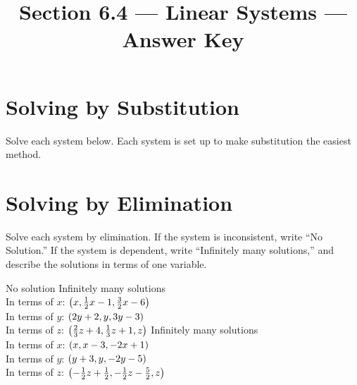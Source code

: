

\title{Section 6.4 --- Linear Systems --- Answer Key}


\maketitle

\section*{Solving by Substitution}
Solve each system below. Each system is set up to make substitution the easiest method.
\begin{smenum}
\maitemxx
{}
{}
\maitemxx
{}
{}
\end{smenum}

\section*{Solving by Elimination}
Solve each system by elimination. If the system is inconsistent, write ``No Solution.'' If the system is dependent, write ``Infinitely many solutions,'' and describe the solutions in terms of one variable.
\begin{smenum}
\maitemxx
{}
{}
\mitemxx
{}
{No solution}
\mitemxx
{}
{Infinitely many solutions\\
In terms of $x$: $\left(x,\frac{1}{2}x-1,\frac{3}{2}x-6\right)$\\
In terms of $y$: $\left(2y+2,y,3y-3\right)$\\
In terms of $z$: $\left(\frac{2}{3}z+4,\frac{1}{3}z+1,z\right)$}
\mitemxx
{}
{Infinitely many solutions\\
In terms of $x$: $\left(x,x-3,-2x+1\right)$\\
In terms of $y$: $\left(y+3,y,-2y-5\right)$\\
In terms of $z$: $\left(-\frac{1}{2}z+\frac{1}{2},-\frac{1}{2}z-\frac{5}{2},z\right)$}
\end{smenum}

